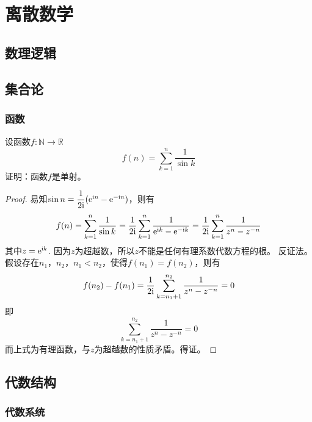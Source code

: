 \chapter{离散数学}

\section{数理逻辑}

\section{集合论}

\subsection{函数}

\begin{proposition}

    设函数$f : \mathbb{N} \to \mathbb{R}$
    $$f(n) = \sum\limits_{k = 1}^{n}{\dfrac{1}{\sin{k}}}$$
    证明：函数$f$是单射。

\end{proposition}

\begin{proof}

    易知$\sin{n} = \dfrac{1}{2\mathrm{i}}(\mathrm{e}^{\mathrm{i} n} - \mathrm{e}^{-\mathrm{i} n})$，则有
    $$f(n) = \sum\limits_{k = 1}^{n}{\dfrac{1}{\sin{k}}} = \dfrac{1}{2\mathrm{i}}\sum\limits_{k = 1}^{n}{\dfrac{1}{\mathrm{e}^{\mathrm{i} k} - \mathrm{e}^{-\mathrm{i} k}}} = \dfrac{1}{2\mathrm{i}}\sum\limits_{k = 1}^{n}{\dfrac{1}{z^n - z^{-n}}}$$
    其中$z = \mathrm{e}^{\mathrm{i} k}$. 因为$z$为超越数，所以$z$不能是任何有理系数代数方程的根。
    反证法。假设存在$n_1$，$n_2$，$n_1 < n_2$，使得$f(n_1) = f(n_2)$，则有
    $$f(n_2) - f(n_1) = \dfrac{1}{2\mathrm{i}}\sum\limits_{k = n_1 + 1}^{n_2}{\dfrac{1}{z^n - z^{-n}}} = 0$$
    即
    $$\sum\limits_{k = n_1 + 1}^{n_2}{\dfrac{1}{z^n - z^{-n}}} = 0$$
    而上式为有理函数，与$z$为超越数的性质矛盾。得证。
    
\end{proof}

\section{代数结构}

\subsection{代数系统}

